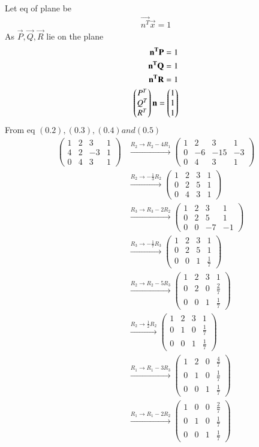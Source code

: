 \documentclass[journal]{IEEEtran}
\newcommand{\augvec}[3]{%
  \left(\begin{array}{*{#1}{c}|*{#2}{c}}
  #3
  \end{array}\right)}
\begin{document}
Let eq of plane be
\begin{align}
    \vec{n^T}\vec{x}=1
\end{align}
As $\vec{P},\vec{Q},\vec{R}$ lie on the plane
\begin{align}
\mathbf{n^T}\mathbf{P}=1\\
\mathbf{n^T}\mathbf{Q}=1\\
\mathbf{n^T}\mathbf{R}=1\\
 \begin{pmatrix}P^T 
        \\
        Q^T
        \\
        R^T\end{pmatrix}
\mathbf{n}
=
\begin{pmatrix}1
       \\
       1
       \\
       1\end{pmatrix}
\end{align}
From eq $(0.2),(0.3),(0.4) and (0.5)$
\begin{align}
\augvec{3}{1}{
1 & 2 & 3 & 1 \\
4 & 2 & -3 & 1 \\
0 & 4 & 3 & 1}
&\xrightarrow{R_2 \to R_2 - 4R_1}
\augvec{3}{1}{
1 & 2 & 3 & 1 \\
0 & -6 & -15 & -3 \\
0 & 4 & 3 & 1} \\[6pt]
&\xrightarrow{R_2 \to -\tfrac{1}{3}R_2}
\augvec{3}{1}{
1 & 2 & 3 & 1 \\
0 & 2 & 5 & 1 \\
0 & 4 & 3 & 1} \\[6pt]
&\xrightarrow{R_3 \to R_3 - 2R_2}
\augvec{3}{1}{
1 & 2 & 3 & 1 \\
0 & 2 & 5 & 1 \\
0 & 0 & -7 & -1} \\[6pt]
&\xrightarrow{R_3 \to -\tfrac{1}{7}R_3}
\augvec{3}{1}{
1 & 2 & 3 & 1 \\
0 & 2 & 5 & 1 \\
0 & 0 & 1 & \tfrac{1}{7}} \\[6pt]
&\xrightarrow{R_2 \to R_2 - 5R_3}
\augvec{3}{1}{
1 & 2 & 3 & 1 \\
0 & 2 & 0 & \tfrac{2}{7} \\
0 & 0 & 1 & \tfrac{1}{7}} \\[6pt]
&\xrightarrow{R_2 \to \tfrac{1}{2}R_2}
\augvec{3}{1}{
1 & 2 & 3 & 1 \\
0 & 1 & 0 & \tfrac{1}{7} \\
0 & 0 & 1 & \tfrac{1}{7}} \\[6pt]
&\xrightarrow{R_1 \to R_1 - 3R_3}
\augvec{3}{1}{
1 & 2 & 0 & \tfrac{4}{7} \\
0 & 1 & 0 & \tfrac{1}{7} \\
0 & 0 & 1 & \tfrac{1}{7}} \\[6pt]
&\xrightarrow{R_1 \to R_1 - 2R_2}
\augvec{3}{1}{
1 & 0 & 0 & \tfrac{2}{7} \\
0 & 1 & 0 & \tfrac{1}{7} \\
0 & 0 & 1 & \tfrac{1}{7}
}
\end{align}
\end{document}
